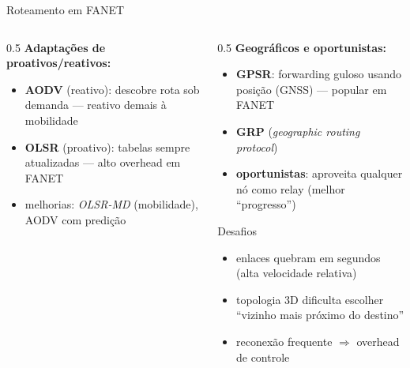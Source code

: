 \documentclass[aspectratio=169,11pt]{beamer}
\begin{document}
\begin{frame}{Roteamento em FANET}
  \begin{columns}
    \begin{column}{0.5\textwidth}
      \textbf{Adaptações de proativos/reativos:}
      \begin{itemize}
        \item \textbf{AODV} (reativo): descobre rota sob demanda --- reativo demais à mobilidade
        \item \textbf{OLSR} (proativo): tabelas sempre atualizadas --- alto overhead em FANET
        \item melhorias: \emph{OLSR-MD} (mobilidade), AODV com predição
      \end{itemize}
    \end{column}
    \begin{column}{0.5\textwidth}
      \textbf{Geográficos e oportunistas:}
      \begin{itemize}
        \item \textbf{GPSR}: forwarding guloso usando posição (GNSS) --- popular em FANET
        \item \textbf{GRP} (\emph{geographic routing protocol})
        \item \textbf{oportunistas}: aproveita qualquer nó como relay (melhor ``progresso'')
      \end{itemize}
      \begin{alertblock}{Desafios}
        \begin{itemize}
          \item enlaces quebram em segundos (alta velocidade relativa)
          \item topologia 3D dificulta escolher ``vizinho mais próximo do destino''
          \item reconexão frequente $\Rightarrow$ overhead de controle
        \end{itemize}
      \end{alertblock}
    \end{column}
  \end{columns}
\end{frame}
\end{document}

